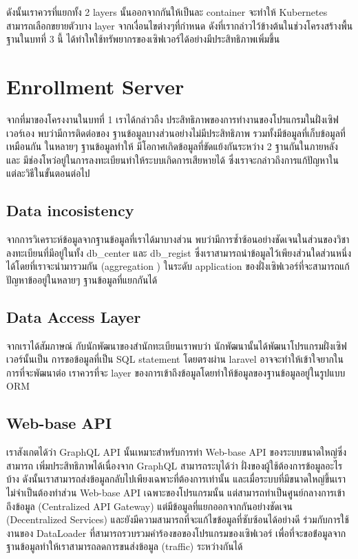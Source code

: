 ดังนั้นเราควรที่แยกทั้ง 2 layers นั้นออกจากกันให้เป็นละ container จะทำให้ Kubernetes สามารถเลือกขยายตัวบาง layer จากเงื่อนไขต่างๆที่กำหนด ดังที่เรากล่าวไว้ข้างต้นในช่วงโครงสร้างพื้นฐานในบทที่ 3 นี้ ได้ทำใหใช้ทรัพยากรของเซิฟเวอร์ได้อย่างมีประสิทธิภาพเพิ่มขึ้น

\section{Enrollment Server}

จากที่มาของโครงงานในบทที่ 1 เราได้กล่าวถืง ประสิทธิภาพของการทำงานของโปรแกรมในฝั่งเซิฟเวอร์เอง พบว่ามีการติดต่อของ ฐานข้อมูลบางส่วนอย่างไม่มีประสิทธิภาพ รวมทั้งมีข้อมูลที่เก็บข้อมูลที่เหมือนกัน ในหลายๆ ฐานข้อมูลทำให้ มีโอกาศเกิดข้อมูลที่ขัดแย้งกันระหว่าง 2 ฐานกันในภายหลัง และ มีช่องโหว่อยู่ในการลงทะเบียนทำให้ระบบเกิดการเสียหายได้ ซึ่งเราจะกล่าวถึงการแก้ปัญหาในแต่ละวิธีในขั้นตอนต่อไป

\subsection{Data incosistency}

จากการวิเคราะห์ข้อมูลจากฐานข้อมูลที่เราได้มาบางส่วน พบว่ามีการซ้ำซ้อนอย่างชัดเจนในส่วนของวิชาลงทะเบียนที่มีอยู่ในทั้ง db\_center และ db\_regist ซึ่งเราสามารถนำข้อมูลไว้เพียงส่วนใดส่วนหนึ่งได้โดยที่เราจะนำมารวมกัน (aggregation \cite{aggregation}) ในระดับ application ของฝั่งเซิฟเวอร์ที่จะสามารถแก้ปัญหาข้ออยู่ในหลายๆ ฐานข้อมูลที่แยกกันได้

\subsection{Data Access Layer}

จากเราได้สัมภาษณ์ กับนักพัฒนาของสำนักทะเบียนเราพบว่า นักพัฒนานั้นได้พัฒนาโปรแกรมฝั่งเซิฟเวอร์นั้นเป็น การขอข้อมูลที่เป็น SQL statement โดยตรงผ่าน laravel อาจจะทำให้เข้าใจยากในการที่จะพัฒนาต่อ เราควรที่จะ layer ของการเข้าถึงข้อมูลโดยทำให้ข้อมูลของฐานข้อมูลอยู่ในรูปแบบ ORM \cite{orm}

\subsection{Web-base API}

เราสังเกตได้ว่า GraphQL API \cite{graphql} นั้นเหมาะสำหรับการทำ Web-base API ของระบบขนาดใหญ่ซึ่งสามารถ เพิ่มประสิทธิภาพได้เนื่องจาก GraphQL สามารถระบุได้ว่า ฝั่งของผู้ใช้ต้องการข้อมูลอะไรบ้าง ดังนั้นเราสามารถส่งข้อมูลกลับไปเพียงเฉพาะที่ต้องการเท่านั้น และเมื่อระบบที่มีขนาดใหญ่ขึ้นเรา ไม่จำเป็นต้องทำส่วน Web-base API เฉพาะของโปรแกรมนั้น แต่สามารถทำเป็นศูนย์กลางการเข้าถึงข้อมูล (Centralized API Gateway) แต่มีข้อมูลที่แยกออกจากกันอย่างชัดเจน (Decentralized Services) และยังมีความสามารถที่จะแก้ไขข้อมูลที่ซับซ้อนได้อย่างดี \cite{graphqlexec} ร่วมกับการใช้งานของ DataLoader ที่สามารถรวบรวมคำร้องขอของโปรแกรมของเซิฟเวอร์ เพื่อที่จะขอข้่อมูลจากฐานข้อมูลทำให้เราสามารถลดการขนส่งข้อมูล (traffic) ระหว่างกันได้


